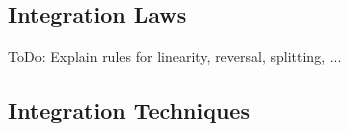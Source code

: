 
\subsection{Integration Laws} 
ToDo: Explain rules for linearity, reversal, splitting, ...










%
%
%









\subsection{Integration Techniques} 

